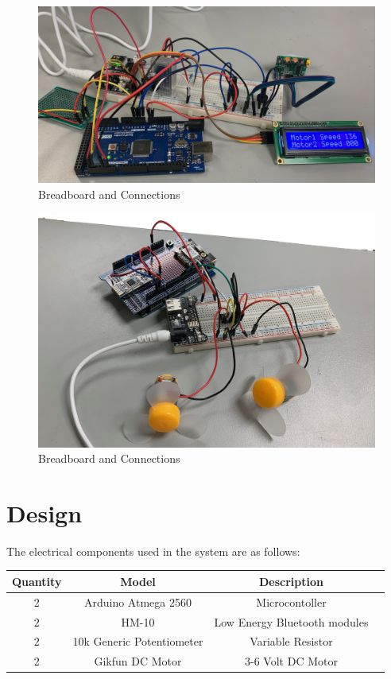 \documentclass[a4paper,12pt]{article} %
\begin{document}
\begin{figure}[h!]
  \center
  \includegraphics[width=\textwidth]{connectionsimage_sensors.png}
  \caption{Breadboard and Connections}
\end{figure}

\begin{figure}[h!]
  \center
  \includegraphics[width=\textwidth]{connectionsimage_motors.png}
  \caption{Breadboard and Connections}
\end{figure}

\section{Design}
The electrical components used in the system are as follows:
\begin{flushleft}

\begin{tabular}{cccc@{}}
\hline
Quantity  & Model & Description \\
 \hline
2  & Arduino Atmega 2560  & Microcontoller \\
2 & HM-10 & Low Energy Bluetooth modules \\
2 & 10k Generic Potentiometer & Variable Resistor \\
2  & Gikfun DC Motor & 3-6 Volt DC Motor \\
\end{tabular}
\end{flushleft}
\end{document}
